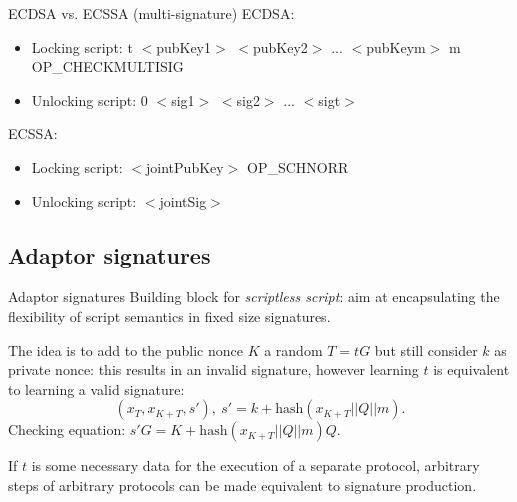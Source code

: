 \documentclass[slidescentered]{beamer}
\begin{document}
	\begin{frame}{ECDSA vs. ECSSA (multi-signature)}
		ECDSA:
		\begin{itemize}
			\item Locking script: t $<$pubKey1$>$ $<$pubKey2$>$ ... $<$pubKeym$>$ \hphantom{em} \hphantom{em} \hphantom{em} \hphantom{ipsem}m
			OP\_CHECKMULTISIG
			\item Unlocking script: 0 $<$sig1$>$ $<$sig2$>$ ... $<$sigt$>$
		\end{itemize}
		
		\bigskip
		\noindent
		ECSSA:
		\begin{itemize}
			\item Locking script: $<$jointPubKey$>$ OP\_SCHNORR
			\item Unlocking script: $<$jointSig$>$
		\end{itemize}
	\end{frame}

	\subsection{Adaptor signatures}
	\begin{frame}{Adaptor signatures}
		Building block for \textit{scriptless script}: aim at encapsulating the flexibility of script semantics in fixed size signatures.
		
		\bigskip
		\noindent
		The idea is to add to the public nonce $K$ a random $T = tG$ but still consider $k$ as private nonce: this results in an invalid signature, however learning $t$ is equivalent to learning a valid signature:
		$$(x_T, x_{K + T}, s'), \ s' = k + \text{hash}(x_{K + T}||Q||m).$$
		\centering
		Checking equation: $s'G = K + \text{hash}(x_{K + T}||Q||m)Q.$
		\par
		
		\bigskip
		\noindent
		If $t$ is some necessary data for the execution of a separate protocol, arbitrary steps of arbitrary protocols can be made equivalent to signature production.
	\end{frame}
\end{document}
